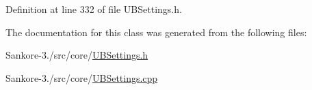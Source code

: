 Definition at line 332 of file U\-B\-Settings.\-h.



The documentation for this class was generated from the following files\-:\begin{DoxyCompactItemize}
\item 
Sankore-\/3./src/core/\hyperlink{_u_b_settings_8h}{U\-B\-Settings.\-h}\item 
Sankore-\/3./src/core/\hyperlink{_u_b_settings_8cpp}{U\-B\-Settings.\-cpp}\end{DoxyCompactItemize}
